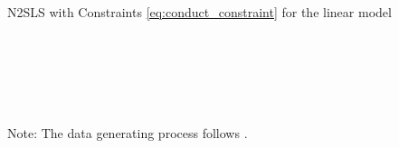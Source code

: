 \documentclass[11pt, a4paper]{article}
\theoremstyle{remark}
\begin{document}
\begin{table}[!htbp]
  \begin{center}
  \caption{N2SLS with Constraints \eqref{eq:conduct_constraint} for the linear model}
  \label{tb:linear_linear_sigma_2_mpec_linear_non_constraint_theta_constraint_bias_rmse} 

  \\[0.5em]
  \begin{adjustbox}{width=0.95\textwidth}
    
  \end{adjustbox}

  \vspace{1em}

  \\[0.5em]
  \begin{adjustbox}{width=0.95\textwidth}
    
  \end{adjustbox}

  \vspace{1em}

  \\[0.5em]
  \begin{adjustbox}{width=0.95\textwidth}
    
  \end{adjustbox}
      
  \end{center}
  \footnotesize
  Note: The data generating process follows \cite{matsumura2023resolving}.
\end{table}

\end{document}
